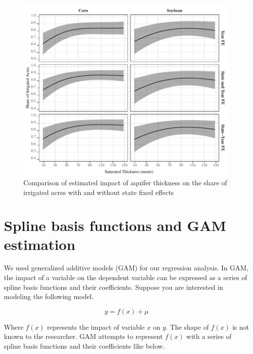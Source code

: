 \documentclass[
]{article}
\begin{document}
\begin{figure}[H]

{\centering \includegraphics[width=6in,]{Figures/g_share_comp} 

}

\caption{Comparison of estimated impact of aquifer thickness on the share of irrigated acres with and without state fixed effects}\label{fig:state-fe-with-without}
\end{figure}

\clearpage

\hypertarget{spline-basis}{%
\section{Spline basis functions and GAM estimation}\label{spline-basis}}

\setcounter{figure}{0}
\renewcommand{\thefigure}{C.\arabic{figure}}

We used generalized additive models (GAM) for our regression analysis. In GAM, the impact of a variable on the dependent variable can be expressed as a series of spline basis functions and their coefficients. Suppose you are interested in modeling the following model.

\begin{equation}
y = f(x) + \mu
\end{equation}

Where \(f(x)\) represents the impact of variable \(x\) on \(y\). The shape of \(f(x)\) is not known to the researcher. GAM attempts to represent \(f(x)\) with a series of spline basis functions and their coefficients like below.
\end{document}
